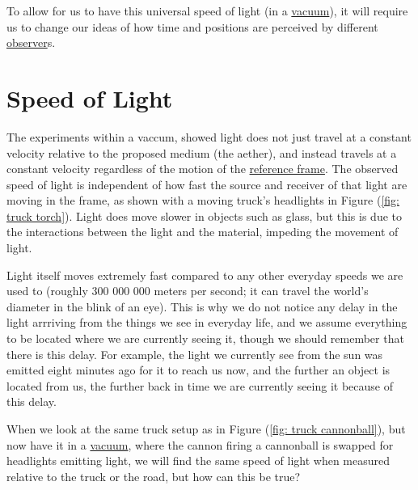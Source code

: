 To allow for us to have this universal speed of light (in a \hyperlink{def-vacuum}{vacuum}), it will require us to change our ideas of how time and positions are perceived by different \hyperlink{def-observer}{observer}s.

\section{Speed of Light} \label{sect: Speed of Light}

The experiments within a vaccum, showed light does not just travel at a constant velocity relative to the proposed medium (the aether), and instead travels at a constant velocity regardless of the motion of the \hyperlink{def-Reference-frame}{reference frame}.
The observed speed of light is independent of how fast the source and receiver of that light are moving in the frame, as shown with a moving truck's headlights in Figure (\ref{fig: truck torch}).
Light does move slower in objects such as glass, but this is due to the interactions between the light and the material, impeding the movement of light.

Light itself moves extremely fast compared to any other everyday speeds we are used to (roughly 300 000 000 meters per second; it can travel the world's diameter in the blink of an eye).
This is why we do not notice any delay in the light arrriving from the things we see in everyday life, and we assume everything to be located where we are currently seeing it, though we should remember that there is this delay.
For example, the light we currently see from the sun was emitted eight minutes ago for it to reach us now, and the further an object is located from us, the further back in time we are currently seeing it because of this delay.

When we look at the same truck setup as in Figure (\ref{fig: truck cannonball}), but now have it in a \hyperlink{def-vacuum}{vacuum}, where the cannon firing a cannonball is swapped for headlights emitting light, we will find the same speed of light when measured relative to the truck or the road, but how can this be true?

